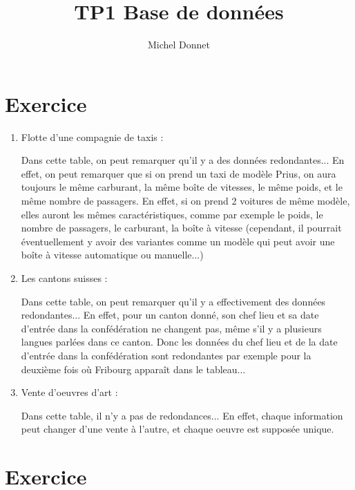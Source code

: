 \documentclass{article}
\title{TP1 Base de données}
\author{Michel Donnet}
\begin{document}
\maketitle

\section{Exercice}

\begin{enumerate}

\item Flotte d'une compagnie de taxis :

Dans cette table, on peut remarquer qu'il y a des données redondantes... En effet, on peut remarquer que si on prend un taxi de modèle Prius, on aura toujours le même carburant, la même boîte de vitesses, le même poids, et le même nombre de passagers. En effet, si on prend 2 voitures de même modèle, elles auront les mêmes caractéristiques, comme par exemple le poids, le nombre de passagers, le carburant, la boîte à vitesse (cependant, il pourrait éventuellement y avoir des variantes comme un modèle qui peut avoir une boîte à vitesse automatique ou manuelle...)

\item Les cantons suisses :

Dans cette table, on peut remarquer qu'il y a effectivement des données redondantes... En effet, pour un canton donné, son chef lieu et sa date d'entrée dans la confédération ne changent pas, même s'il y a plusieurs langues parlées dans ce canton. Donc les données du chef lieu et de la date d'entrée dans la confédération sont redondantes par exemple pour la deuxième fois où Fribourg apparaît dans le tableau...

\item Vente d'oeuvres d'art :

Dans cette table, il n'y a pas de redondances... En effet, chaque information peut changer d'une vente à l'autre, et chaque oeuvre est supposée unique.
\end{enumerate}
\section{Exercice}
\end{document}
